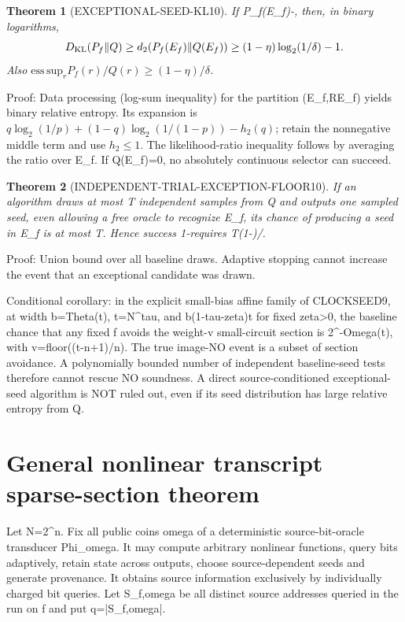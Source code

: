 \documentclass[11pt]{article}
\newtheorem{theorem}{Theorem}
\begin{document}
\begin{theorem}[EXCEPTIONAL-SEED-KL10]
If P_f(E_f)-\eta, then, in binary logarithms,
\[
D_{\rm KL}(P_f\|Q)\ge d_2(P_f(E_f)\|Q(E_f))
\ge(1-\eta)\log_2(1/\delta)-1.
\]
Also \(\mathrm{ess\,sup}_r P_f(r)/Q(r)\ge (1-\eta)/\delta\).
\end{theorem}
\noindent Proof: Data processing (log-sum inequality) for the partition (E_f,R\setminus E_f) yields binary relative entropy. Its expansion is \(q\log_2(1/p)+(1-q)\log_2(1/(1-p))-h_2(q)\); retain the nonnegative middle term and use \(h_2\le1\). The likelihood-ratio inequality follows by averaging the ratio over E_f. If Q(E_f)=0, no absolutely continuous selector can succeed.

\begin{theorem}[INDEPENDENT-TRIAL-EXCEPTION-FLOOR10]
If an algorithm draws at most T independent samples from Q and outputs one sampled seed, even allowing a free oracle to recognize E_f, its chance of producing a seed in E_f is at most T\delta. Hence success 1-\eta requires T\ge(1-\eta)/\delta.
\end{theorem}
\noindent Proof: Union bound over all baseline draws. Adaptive stopping cannot increase the event that an exceptional candidate was drawn.

\noindent Conditional corollary: in the explicit small-bias affine family of CLOCKSEED9, at width b=Theta(t), t=N^tau, and b\le(1-tau-zeta)t for fixed zeta>0, the baseline chance that any fixed f avoids the weight-v small-circuit section is 2^{-Omega(t)}, with v=floor((t-n+1)/n). The true image-NO event is a subset of section avoidance. A polynomially bounded number of independent baseline-seed tests therefore cannot rescue NO soundness. A direct source-conditioned exceptional-seed algorithm is NOT ruled out, even if its seed distribution has large relative entropy from Q.

\section*{General nonlinear transcript sparse-section theorem}
Let N=2^n. Fix all public coins omega of a deterministic source-bit-oracle transducer Phi_omega. It may compute arbitrary nonlinear functions, query bits adaptively, retain state across outputs, choose source-dependent seeds and generate provenance. It obtains source information exclusively by individually charged bit queries. Let S_{f,omega} be all distinct source addresses queried in the run on f and put q=|S_{f,omega}|.
\end{document}
